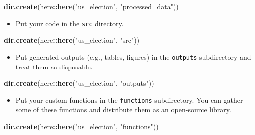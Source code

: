 \documentclass[
]{book}
\newenvironment{Shaded}{\begin{snugshade}}{\end{snugshade}}
\newcommand{\KeywordTok}[1]{\textcolor[rgb]{0.13,0.29,0.53}{\textbf{#1}}}
\newcommand{\NormalTok}[1]{#1}
\newcommand{\OperatorTok}[1]{\textcolor[rgb]{0.81,0.36,0.00}{\textbf{#1}}}
\newcommand{\StringTok}[1]{\textcolor[rgb]{0.31,0.60,0.02}{#1}}
\providecommand{\tightlist}{%
  \setlength{\itemsep}{0pt}\setlength{\parskip}{0pt}}
\begin{document}
\begin{Shaded}
\begin{Highlighting}[]
\KeywordTok{dir.create}\NormalTok{(here}\OperatorTok{::}\KeywordTok{here}\NormalTok{(}\StringTok{"us\_election"}\NormalTok{, }\StringTok{"processed\_data"}\NormalTok{))}
\end{Highlighting}
\end{Shaded}

\begin{itemize}
\tightlist
\item
  Put your code in the \texttt{src} directory.
\end{itemize}

\begin{Shaded}
\begin{Highlighting}[]
\KeywordTok{dir.create}\NormalTok{(here}\OperatorTok{::}\KeywordTok{here}\NormalTok{(}\StringTok{"us\_election"}\NormalTok{, }\StringTok{"src"}\NormalTok{))}
\end{Highlighting}
\end{Shaded}

\begin{itemize}
\tightlist
\item
  Put generated outputs (e.g., tables, figures) in the \texttt{outputs} subdirectory and treat them as disposable.
\end{itemize}

\begin{Shaded}
\begin{Highlighting}[]
\KeywordTok{dir.create}\NormalTok{(here}\OperatorTok{::}\KeywordTok{here}\NormalTok{(}\StringTok{"us\_election"}\NormalTok{, }\StringTok{"outputs"}\NormalTok{))}
\end{Highlighting}
\end{Shaded}

\begin{itemize}
\tightlist
\item
  Put your custom functions in the \texttt{functions} subdirectory. You can gather some of these functions and distribute them as an open-source library.
\end{itemize}

\begin{Shaded}
\begin{Highlighting}[]
\KeywordTok{dir.create}\NormalTok{(here}\OperatorTok{::}\KeywordTok{here}\NormalTok{(}\StringTok{"us\_election"}\NormalTok{, }\StringTok{"functions"}\NormalTok{))}
\end{Highlighting}
\end{Shaded}
\end{document}
